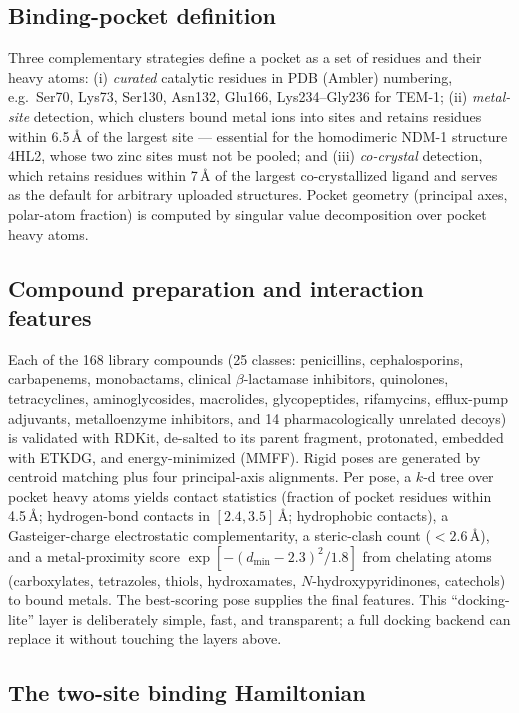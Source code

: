 \documentclass[10pt,twocolumn]{article}
\begin{document}
\subsection{Binding-pocket definition}

Three complementary strategies define a pocket as a set of residues and their heavy
atoms: (i) \emph{curated} catalytic residues in PDB (Ambler) numbering, e.g.\ Ser70,
Lys73, Ser130, Asn132, Glu166, Lys234--Gly236 for TEM-1; (ii) \emph{metal-site}
detection, which clusters bound metal ions into sites and retains residues within
6.5\,\AA{} of the largest site --- essential for the homodimeric NDM-1 structure
4HL2, whose two zinc sites must not be pooled; and (iii) \emph{co-crystal} detection,
which retains residues within 7\,\AA{} of the largest co-crystallized ligand and serves
as the default for arbitrary uploaded structures. Pocket geometry (principal axes,
polar-atom fraction) is computed by singular value decomposition over pocket heavy
atoms.

\subsection{Compound preparation and interaction features}

Each of the 168 library compounds (25 classes: penicillins, cephalosporins,
carbapenems, monobactams, clinical $\beta$-lactamase inhibitors, quinolones,
tetracyclines, aminoglycosides, macrolides, glycopeptides, rifamycins, efflux-pump
adjuvants, metalloenzyme inhibitors, and 14 pharmacologically unrelated decoys) is
validated with RDKit, de-salted to its parent fragment, protonated, embedded with
ETKDG, and energy-minimized (MMFF). Rigid poses are generated by centroid matching
plus four principal-axis alignments. Per pose, a $k$-d tree over pocket heavy atoms
yields contact statistics (fraction of pocket residues within 4.5\,\AA; hydrogen-bond
contacts in $[2.4,3.5]$\,\AA; hydrophobic contacts), a Gasteiger-charge
electrostatic complementarity, a steric-clash count ($<2.6$\,\AA), and a metal-proximity
score $\exp[-(d_{\min}-2.3)^2/1.8]$ from chelating atoms (carboxylates, tetrazoles,
thiols, hydroxamates, $N$-hydroxypyridinones, catechols) to bound metals. The
best-scoring pose supplies the final features. This ``docking-lite'' layer is
deliberately simple, fast, and transparent; a full docking backend can replace it
without touching the layers above.

\subsection{The two-site binding Hamiltonian}
\end{document}

